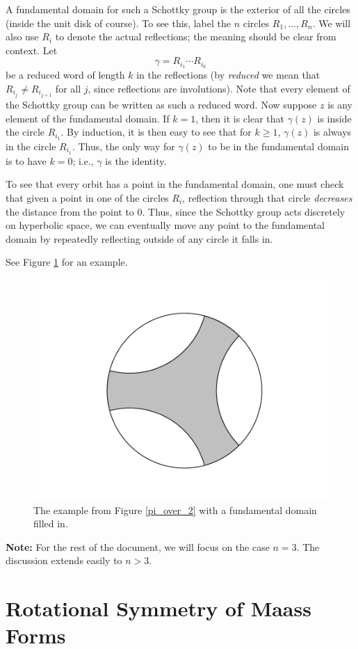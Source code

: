 \documentclass[]{article}
\begin{document}
A fundamental domain for such a Schottky group is the exterior of all the circles (inside the unit disk of course).
To see this, label the $n$ circles $R_1, \dots, R_n$.
We will also use $R_i$ to denote the actual reflections; the meaning should be clear from context.
Let
$$
\gamma = R_{i_1}\cdots R_{i_k}
$$
be a reduced word of length $k$ in the reflections (by \textit{reduced} we mean that $R_{i_j} \neq R_{i_{j+1}}$ for all $j$, since reflections are involutions).
Note that every element of the Schottky group can be written as such a reduced word.
Now suppose $z$ is any element of the fundamental domain.
If $k = 1$, then it is clear that $\gamma(z)$ is inside the circle $R_{i_1}$.
By induction, it is then easy to see that for $k \geq 1$, $\gamma(z)$ is always in the circle $R_{i_1}$.
Thus, the only way for $\gamma(z)$ to be in the fundamental domain is to have $k = 0$; i.e., $\gamma$ is the identity.

To see that every orbit has a point in the fundamental domain, one must check that given a point in one of the circles $R_i$, reflection through that circle \textit{decreases} the distance from the point to $0$.
Thus, since the Schottky group acts discretely on hyperbolic space, we can eventually move any point to the fundamental domain by repeatedly reflecting outside of any circle it falls in.

See Figure \ref{disk_FD} for an example.

\begin{figure}[h]
	\centering
	\includegraphics[trim=110 40 100 50, clip, width=0.6\linewidth]{disk_FD.pdf}
	\caption{The example from Figure \ref{pi_over_2} with a fundamental domain filled in.}
	\label{disk_FD}
\end{figure}

\textbf{Note:} For the rest of the document, we will focus on the case $n = 3$.
The discussion extends easily to $n > 3$.

\section*{Rotational Symmetry of Maass Forms}
\end{document}
